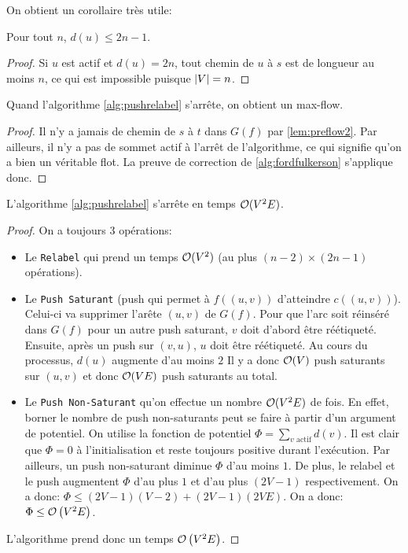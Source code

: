 \documentclass[math, info]{cours}
\begin{document}
On obtient un corollaire très utile:
\begin{corollaire}
	Pour tout $n$, $d(u) \leq 2n - 1$.
	\label{cor:preflow1}
\end{corollaire}
\begin{proof}
	Si $u$ est actif et $d(u) = 2n$, tout chemin de $u$ à $s$ est de longueur au moins $n$, ce qui est impossible puisque $\left|V\right| = n$.
\end{proof}

\begin{thm}
	Quand l'algorithme \ref{alg:pushrelabel} s'arrête, on obtient un max-flow.
	\label{thm:pushrelabel}
\end{thm}
\begin{proof}
	Il n'y a jamais de chemin de $s$ à $t$ dans $G(f)$ par \ref{lem:preflow2}.
	Par ailleurs, il n'y a pas de sommet actif à l'arrêt de l'algorithme, ce qui signifie qu'on a bien un véritable flot.
	La preuve de correction de \ref{alg:fordfulkerson} s'applique donc.
\end{proof}

\begin{thm}
	L'algorithme \ref{alg:pushrelabel} s'arrête en temps $\mathcal{O}(V^{2}E)$.
\end{thm}

\begin{proof}
	On a toujours $3$ opérations:
	\begin{itemize}
		\item Le \texttt{Relabel} qui prend un temps $\mathcal{O}(V^{2})$ (au plus $(n-2) \times (2n-1)$ opérations).
		\item Le \texttt{Push Saturant} (push qui permet à $f((u, v))$ d'atteindre $c((u, v))$). Celui-ci va supprimer l'arête $(u, v)$ de $G(f)$.
		      Pour que l'arc soit réinséré dans $G(f)$ pour un autre push saturant,
		      $v$ doit d'abord être réétiqueté.
		      Ensuite, après un push sur $(v, u)$, $u$ doit être réétiqueté.
		      Au cours du processus, $d(u)$ augmente d'au moins $2$
		      Il y a donc $\mathcal{O}(V)$ push saturants sur $(u, v)$ et donc $\mathcal{O}(VE)$ push saturants au total.
		\item Le \texttt{Push Non-Saturant} qu'on effectue un nombre $\mathcal{O}(V^{2}E)$ de fois.
		      En effet, borner le nombre de push non-saturants peut se faire à partir d'un argument de potentiel.
		      On utilise la fonction de potentiel $\Phi =\sum_{v \text{ actif}} d(v)$.
		      Il est clair que $\Phi = 0$ à l'initialisation et reste toujours positive durant l'exécution.
		      Par ailleurs, un push non-saturant diminue $\Phi$ d'au moins $1$.
		      De plus, le relabel et le push augmentent $\Phi$ d'au plus $1$ et d'au plus $(2V - 1)$ respectivement.
		      On a donc: $\Phi \leq \left(2V-1\right)\left(V - 2\right) + \left(2V - 1\right)\left(2VE\right)$.
		      On a donc: $\Phi \leq \mathcal{O}\left(V^{2}E\right)$.
	\end{itemize}
	L'algorithme prend donc un temps $\mathcal{O}\left(V^{2}E\right)$.
\end{proof}
\end{document}
